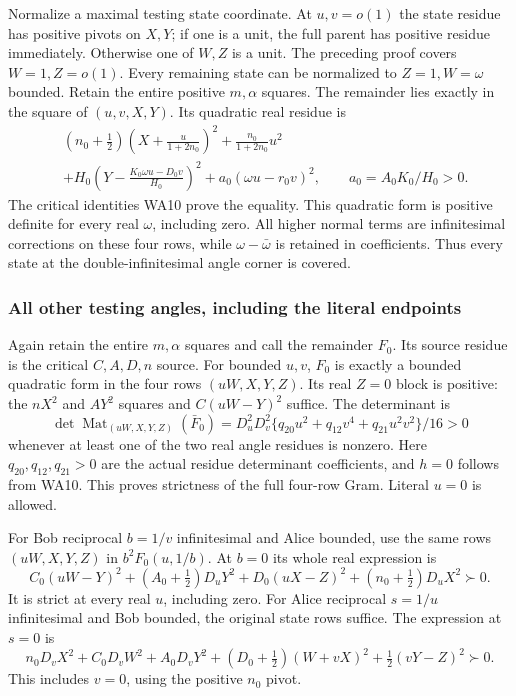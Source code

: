 Normalize a maximal testing state coordinate. At \(u,v=o(1)\)
the state residue has positive pivots on \(X,Y\); if one is a unit,
the full parent has positive residue immediately. Otherwise one
of \(W,Z\) is a unit. The preceding proof covers \(W=1,Z=o(1)\).
Every remaining state can be normalized to \(Z=1,W=\omega\)
bounded. Retain the entire positive \(m,\alpha\) squares.
The remainder lies exactly in the square of \((u,v,X,Y)\).
Its quadratic real residue is
\[
\begin{aligned}
 &(n_0+\tfrac12)\left(X+\frac{u}{1+2n_0}\right)^2
     +\frac{n_0}{1+2n_0}u^2\\
 &+H_0\left(Y-\frac{K_0\omega u-D_0v}{H_0}\right)^2
     +a_0(\omega u-r_0v)^2,\qquad a_0=A_0K_0/H_0>0 .
\end{aligned}\tag{WA22}
\]
The critical identities WA10 prove the equality. This quadratic
form is positive definite for every real \(\omega\), including zero.
All higher normal terms are infinitesimal corrections on these
four rows, while \(\omega-\bar\omega\) is retained in coefficients.
Thus every state at the double-infinitesimal angle corner is covered.

\subsubsection*{All other testing angles, including the literal endpoints}

Again retain the entire \(m,\alpha\) squares and call the remainder
\(F_0\). Its source residue is the critical \(C,A,D,n\) source.
For bounded \(u,v\), \(F_0\) is exactly a bounded quadratic form
in the four rows \((uW,X,Y,Z)\). Its real \(Z=0\) block is positive:
the \(nX^2\) and \(AY^2\) squares and \(C(uW-Y)^2\) suffice.
The determinant is
\[
 \det \operatorname{Mat}_{(uW,X,Y,Z)}(\bar F_0)
 =D_u^2D_v^2\{q_{20}u^2+q_{12}v^4+q_{21}u^2v^2\}/16>0
 \tag{WA23}
\]
whenever at least one of the two real angle residues is nonzero.
Here \(q_{20},q_{12},q_{21}>0\) are the actual residue determinant
coefficients, and \(h=0\) follows from WA10. This proves strictness
of the full four-row Gram. Literal \(u=0\) is allowed.

For Bob reciprocal \(b=1/v\) infinitesimal and Alice bounded,
use the same rows \((uW,X,Y,Z)\) in \(b^2F_0(u,1/b)\).
At \(b=0\) its whole real expression is
\[
 C_0(uW-Y)^2+(A_0+\tfrac12)D_uY^2
             +D_0(uX-Z)^2+(n_0+\tfrac12)D_uX^2\succ0 .
 \tag{WA24}
\]
It is strict at every real \(u\), including zero.
For Alice reciprocal \(s=1/u\) infinitesimal and Bob bounded,
the original state rows suffice. The expression at \(s=0\) is
\[
 n_0D_vX^2+C_0D_vW^2+A_0D_vY^2
          +(D_0+\tfrac12)(W+vX)^2+\tfrac12(vY-Z)^2\succ0 .
 \tag{WA25}
\]
This includes \(v=0\), using the positive \(n_0\) pivot.

